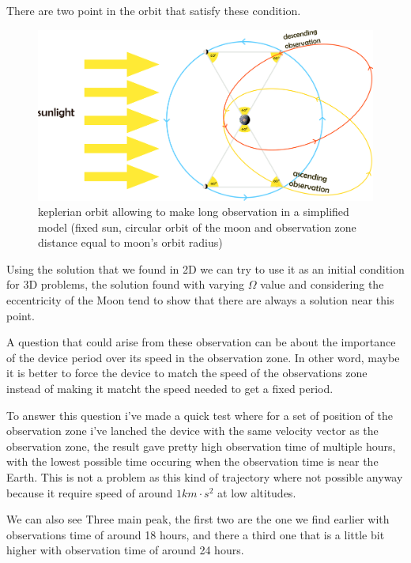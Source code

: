 \documentclass[11pt]{article} %
\begin{document}
		There are two point in the orbit that satisfy these condition.
		
		
		\begin{figure}[h]
			\includegraphics[width=1\textwidth]{images/observations_main.png}
			\caption{keplerian orbit allowing to make long observation in a simplified model (fixed sun, circular orbit of the moon and observation zone distance equal to moon's orbit radius)}
		\end{figure}
		
		Using the solution that we found in 2D we can try to use it as an initial condition for 3D problems, the solution found with varying $\Omega$ value and considering the eccentricity of the Moon tend to show that there are always a solution near this point.
		
		A question that could arise from these observation can be about the importance of the device period over its speed in the observation zone. In other word, maybe it is better to force the device to match the speed of the observations zone instead of making it matcht the speed needed to get a fixed period.
		
		To answer this question i've made a quick test where for a set of position of the observation zone i've lanched the device with the same velocity vector as the observation zone, the result gave pretty high observation time of multiple hours, with the lowest possible time occuring when the observation time is near the Earth. This is not a problem as this kind of trajectory where not possible anyway because it require speed of around $1 km\cdot s^2$ at low altitudes.
		
		We can also see Three main peak, the first two are the one we find earlier with observations time of around 18 hours, and there a third one that is a little bit higher with observation time of around 24 hours.
		
\end{document}
